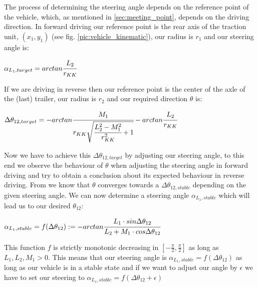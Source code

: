 The process of determining the steering angle depends on the reference point of the vehicle, which, as mentioned in \ref{sec:meeting_point}, depends on the driving direction. In forward driving our reference point is the rear axis of the traction unit, $(x_1,y_1)$ (see fig. \ref{pic:vehicle_kinematic}), our radius is $r_1$ and our steering angle is:

\begin{center}
$ \alpha_{L_1,target} = arctan \cfrac{L_2}{r_{KK}} $
\end{center}

If we are driving in reverse then our reference point is the center of the axle of the (last) trailer, our radius is $r_2$ and our required direction $\theta$ is:

\begin{center}
$\Delta \theta_{12,target}=-arctan \cfrac{M_1}{r_{KK} \sqrt{\cfrac{L_2^2-M^2_1}{r^2_{KK}}+1}}-arctan \cfrac{L_2}{r_{KK}}$
\end{center}

Now we have to achieve this $\Delta \theta_{12,target}$ by adjusting our steering angle, to this end we observe the behaviour of $\theta$ when adjusting the steering angle in forward driving and try to obtain a conclusion about its expected behaviour in reverse driving. From \cite{12} we know that $\theta$ converges towards a $\Delta \theta_{12,stable}$ depending on the given steering angle. We can now determine a steering angle $\alpha_{L_1,stable}$ which will lead us to our desired $\theta_{12}$:

\begin{center}
$\alpha_{L_1,stable}=f(\Delta \theta_{12}):=-arctan \cfrac{L_1 \cdot sin \Delta \theta_{12}}{L_2+M_1 \cdot cos \Delta \theta_{12}}$
\end{center}

This function $f$ is strictly monotonic decreasing in $\left[- \tfrac{\pi}{2},\tfrac{\pi}{2} \right]$ as long as $L_1, L_2, M_1 >0$. This means that our steering angle is $\alpha_{L_1,stable}=f(\Delta \theta_{12})$ as long as our vehicle is in a stable state and if we want to adjust our angle by $\epsilon$ we have to set our steering to $\alpha_{L_1,stable}=f(\Delta \theta_{12}+\epsilon)$





